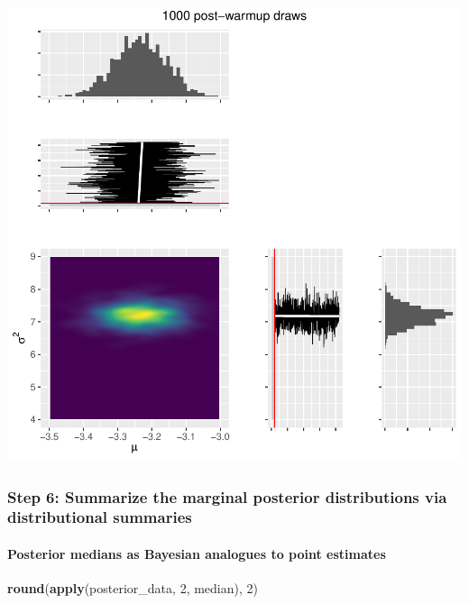 \documentclass[
  11pt,
]{article}
\newenvironment{Shaded}{\begin{snugshade}}{\end{snugshade}}
\newcommand{\DecValTok}[1]{\textcolor[rgb]{0.00,0.00,0.81}{#1}}
\newcommand{\FunctionTok}[1]{\textcolor[rgb]{0.13,0.29,0.53}{\textbf{#1}}}
\newcommand{\NormalTok}[1]{#1}
\begin{document}
\begin{center}\includegraphics{01-02-lec_files/figure-latex/posterior-post-warmup-1} \end{center}

\hypertarget{step-6-summarize-the-marginal-posterior-distributions-via-distributional-summaries}{%
\subsubsection{Step 6: Summarize the marginal posterior distributions via distributional summaries}\label{step-6-summarize-the-marginal-posterior-distributions-via-distributional-summaries}}

\hypertarget{posterior-medians-as-bayesian-analogues-to-point-estimates}{%
\paragraph{Posterior medians as Bayesian analogues to point estimates}\label{posterior-medians-as-bayesian-analogues-to-point-estimates}}

\begin{Shaded}
\begin{Highlighting}[]
\FunctionTok{round}\NormalTok{(}\FunctionTok{apply}\NormalTok{(posterior\_data, }\DecValTok{2}\NormalTok{, median), }\DecValTok{2}\NormalTok{)}
\end{Highlighting}
\end{Shaded}
\end{document}
